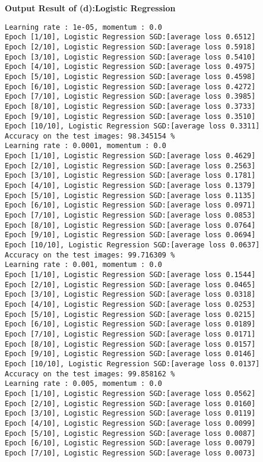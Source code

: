 \documentclass[10pt]{article}
\newcommand{\0}{{\mathbf{0}}}
\newcommand{\1}{{\mathbf{1}}}
\begin{document}
\newpage
\textbf{Output Result of (d):Logistic Regression}
\begin{verbatim}
Learning rate : 1e-05, momentum : 0.0
Epoch [1/10], Logistic Regression SGD:[average loss 0.6512]
Epoch [2/10], Logistic Regression SGD:[average loss 0.5918]
Epoch [3/10], Logistic Regression SGD:[average loss 0.5410]
Epoch [4/10], Logistic Regression SGD:[average loss 0.4975]
Epoch [5/10], Logistic Regression SGD:[average loss 0.4598]
Epoch [6/10], Logistic Regression SGD:[average loss 0.4272]
Epoch [7/10], Logistic Regression SGD:[average loss 0.3985]
Epoch [8/10], Logistic Regression SGD:[average loss 0.3733]
Epoch [9/10], Logistic Regression SGD:[average loss 0.3510]
Epoch [10/10], Logistic Regression SGD:[average loss 0.3311]
Accuracy on the test images: 98.345154 %
Learning rate : 0.0001, momentum : 0.0
Epoch [1/10], Logistic Regression SGD:[average loss 0.4629]
Epoch [2/10], Logistic Regression SGD:[average loss 0.2563]
Epoch [3/10], Logistic Regression SGD:[average loss 0.1781]
Epoch [4/10], Logistic Regression SGD:[average loss 0.1379]
Epoch [5/10], Logistic Regression SGD:[average loss 0.1135]
Epoch [6/10], Logistic Regression SGD:[average loss 0.0971]
Epoch [7/10], Logistic Regression SGD:[average loss 0.0853]
Epoch [8/10], Logistic Regression SGD:[average loss 0.0764]
Epoch [9/10], Logistic Regression SGD:[average loss 0.0694]
Epoch [10/10], Logistic Regression SGD:[average loss 0.0637]
Accuracy on the test images: 99.716309 %
Learning rate : 0.001, momentum : 0.0
Epoch [1/10], Logistic Regression SGD:[average loss 0.1544]
Epoch [2/10], Logistic Regression SGD:[average loss 0.0465]
Epoch [3/10], Logistic Regression SGD:[average loss 0.0318]
Epoch [4/10], Logistic Regression SGD:[average loss 0.0253]
Epoch [5/10], Logistic Regression SGD:[average loss 0.0215]
Epoch [6/10], Logistic Regression SGD:[average loss 0.0189]
Epoch [7/10], Logistic Regression SGD:[average loss 0.0171]
Epoch [8/10], Logistic Regression SGD:[average loss 0.0157]
Epoch [9/10], Logistic Regression SGD:[average loss 0.0146]
Epoch [10/10], Logistic Regression SGD:[average loss 0.0137]
Accuracy on the test images: 99.858162 %
Learning rate : 0.005, momentum : 0.0
Epoch [1/10], Logistic Regression SGD:[average loss 0.0562]
Epoch [2/10], Logistic Regression SGD:[average loss 0.0160]
Epoch [3/10], Logistic Regression SGD:[average loss 0.0119]
Epoch [4/10], Logistic Regression SGD:[average loss 0.0099]
Epoch [5/10], Logistic Regression SGD:[average loss 0.0087]
Epoch [6/10], Logistic Regression SGD:[average loss 0.0079]
Epoch [7/10], Logistic Regression SGD:[average loss 0.0073]

\end{verbatim}
\end{document}
